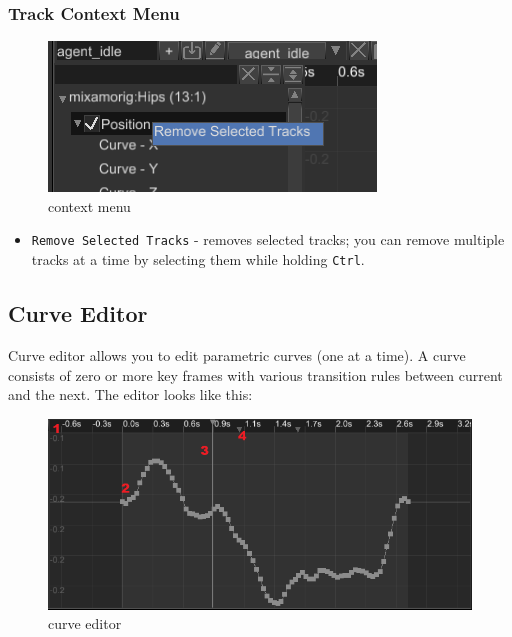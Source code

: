 \documentclass[
]{book}
\providecommand{\tightlist}{%
  \setlength{\itemsep}{0pt}\setlength{\parskip}{0pt}}
\theoremstyle{definition}
\theoremstyle{definition}
\theoremstyle{definition}
\theoremstyle{definition}
\theoremstyle{remark}
\begin{document}
\subsubsection{Track Context Menu}\label{track-context-menu}

\begin{figure}
\centering
\includegraphics{images/animation/ae_track_context_menu.png}
\caption{context menu}
\end{figure}

\begin{itemize}
\tightlist
\item
  \texttt{Remove\ Selected\ Tracks} - removes selected tracks; you can remove multiple tracks at a time by selecting them while holding \texttt{Ctrl}.
\end{itemize}

\subsection{Curve Editor}\label{curve-editor}

Curve editor allows you to edit parametric curves (one at a time). A curve consists of zero or more key frames with various transition rules between current and the next. The editor looks like this:

\begin{figure}
\centering
\includegraphics{images/animation/ae_curve_editor.png}
\caption{curve editor}
\end{figure}
\end{document}
